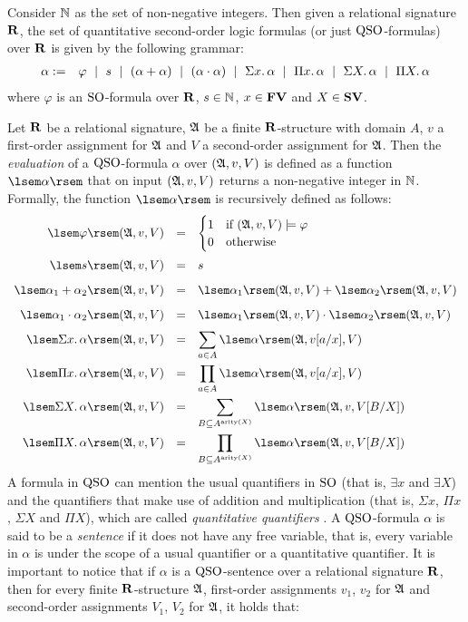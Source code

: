 Consider $\mathbb{N}$ as the set of non-negative integers. Then given a relational signature $\mathbf{R}$, the set of quantitative second-order logic formulas (or just ${\rm QSO}$-formulas) over $\mathbf{R}$ is given by the following grammar:
\begin{eqnarray}
\label{eq-def-qso}
  \alpha & := & \varphi \ \mid \ s \ \mid \ (\alpha + \alpha) \ \mid\ (\alpha \cdot \alpha) \ \mid \ \Sigma{x}.\, \alpha \ \mid \ \Pi{x}.\, \alpha \ \mid \ \Sigma{X}.\, \alpha \ \mid \ \Pi{X}.\, \alpha 
\end{eqnarray}
where $\varphi$ is an ${\rm SO}$-formula over $\mathbf{R}$, $s \in \mathbb{N}$, $x \in \mathbf{FV}$ and $X \in \mathbf{SV}$.

Let $\mathbf{R}$ be a relational signature, $\mathfrak{A}$ be a finite $\mathbf{R}$-structure with domain $A$, $v$ a first-order assignment for $\mathfrak{A}$ and $V$ a second-order assignment for $\mathfrak{A}$. Then the \emph{evaluation} of a ${\rm QSO}$-formula $\alpha$ over $(\mathfrak{A}, v, V)$ is defined as a function $\sem{\alpha}$ that on input $(\mathfrak{A}, v, V)$ returns a non-negative integer in $\mathbb{N}$. Formally, the function $\sem{\alpha}$ is recursively defined as follows:
$$
\renewcommand{\arraystretch}{1.7}
\begin{array}{rcl} 
\sem{\varphi}(\A, v, V) & = & 
\begin{cases}
1 & \mbox{if } (\A, v, V) \models \varphi \\
0 & \mbox{otherwise}
\end{cases}\\
\sem{s}(\A, v, V) & = & s \\
\sem{\alpha_1 \add \alpha_2}(\A, v, V) & = & \sem{\alpha_1}(\A, v, V) + \sem{\alpha_2}(\A, v, V)\\
\sem{\alpha_1 \mult \alpha_2}(\A, v, V) & = & \sem{\alpha_1}(\A, v, V) \cdot \sem{\alpha_2}(\A, v, V)\\ 
\sem{\sa{x} \alpha}(\A, v, V) & = & \displaystyle \sum_{a \in A} \sem{\alpha}(\A,v[a/x],V)\\
\sem{\pa{x} \alpha}(\A, v, V) & = & \displaystyle \prod_{a \in A} \sem{\alpha}(\A,v[a/x],V)\\
\sem{\sa{X} \alpha}(\A, v, V) & = & \displaystyle \sum_{B \subseteq A^{\arity(X)}} \sem{\alpha}(\A, v, V[B/X])\\
\sem{\pa{X} \alpha}(\A, v, V) & = & \displaystyle \prod_{B \subseteq A^{\arity(X)}} \sem{\alpha}(\A, v, V[B/X])
\end{array}
$$
A formula in ${\rm QSO}$ can mention the usual quantifiers in ${\rm SO}$ (that is, $\exists x$ and $\exists X$) and the quantifiers that make use of addition and multiplication (that is, $\Sigma x$, $\Pi x$, $\Sigma X$ and $\Pi X$), which are called {\em quantitative quantifiers} . A ${\rm QSO}$-formula $\alpha$ is said to be a \emph{sentence} if it does not have any free variable, that is, every variable in $\alpha$ is under the scope of a usual quantifier or a quantitative quantifier. It is important to notice that if $\alpha$ is a ${\rm QSO}$-sentence over a relational signature $\mathbf{R}$, then for every finite $\mathbf{R}$-structure $\mathfrak{A}$, first-order assignments $v_1$, $v_2$ for $\mathfrak{A}$ and second-order assignments $V_1$, $V_2$ for $\mathfrak{A}$, it holds that:
